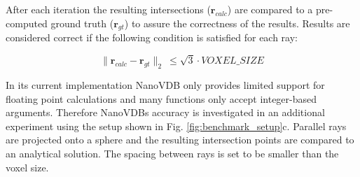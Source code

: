 After each iteration the resulting intersections ($\mathbf{r}_{calc}$) are compared to a pre-computed ground truth ($\mathbf{r}_{gt}$) to assure the correctness of the results. 
Results are considered correct if the following condition is satisfied for each ray:

\begin{equation}
	\lVert \mathbf{r}_{calc} - \mathbf{r}_{gt} \lVert _2 \:  \leq \sqrt{3} \cdot VOXEL\_SIZE
\end{equation}

In its current implementation NanoVDB only provides limited support for floating point calculations and  many functions only accept integer-based arguments.
Therefore NanoVDBs accuracy is investigated in an additional experiment using the setup shown in Fig. \ref{fig:benchmark_setup}c.
Parallel rays are projected onto a sphere and the resulting intersection points are compared to an analytical solution. 
The spacing between rays is set to be smaller than the voxel size. 

